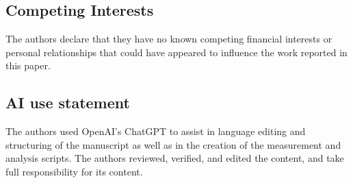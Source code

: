 \documentclass[pdflatex,sn-vancouver-num]{sn-jnl}%
\theoremstyle{thmstyleone}%
\theoremstyle{thmstyletwo}%
\theoremstyle{thmstylethree}%
\begin{document}
\subsection{Competing Interests}
The authors declare that they have no known competing financial interests or personal relationships that could have appeared to influence the work reported in this paper.

\subsection{AI use statement}
The authors used OpenAI's ChatGPT to assist in language editing and structuring of the manuscript as well as in the creation of the measurement and analysis scripts. The authors reviewed, verified, and edited the content, and take full responsibility for its content.











\end{document}
